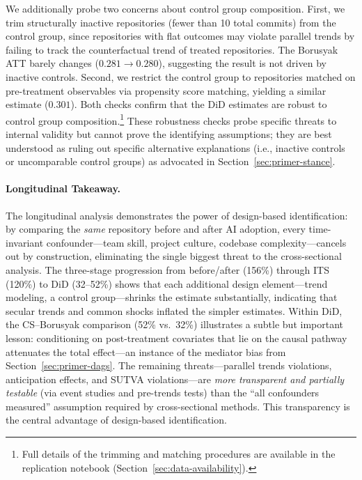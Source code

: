 We additionally probe two concerns about control group composition.
First, we trim structurally inactive repositories (fewer than 10 total commits) from the control group, since repositories with flat outcomes may violate parallel trends by failing to track the counterfactual trend of treated repositories.
The Borusyak ATT barely changes ($0.281 \to 0.280$), suggesting the result is not driven by inactive controls.
Second, we restrict the control group to repositories matched on pre-treatment observables via propensity score matching, yielding a similar estimate ($0.301$).
Both checks confirm that the DiD estimates are robust to control group composition.\footnote{Full details of the trimming and matching procedures are available in the replication notebook (Section~\ref{sec:data-availability}).}
These robustness checks probe specific threats to internal validity but cannot prove the identifying assumptions; they are best understood as ruling out specific alternative explanations (i.e., inactive controls or uncomparable control groups) as advocated in Section~\ref{sec:primer-stance}.

\paragraph{Longitudinal Takeaway.}
\label{sec:longitudinal-takeaway}

The longitudinal analysis demonstrates the power of design-based identification: by comparing the \emph{same} repository before and after AI adoption, every time-invariant confounder---team skill, project culture, codebase complexity---cancels out by construction, eliminating the single biggest threat to the cross-sectional analysis.
The three-stage progression from before/after (156\%) through ITS (120\%) to DiD (32--52\%) shows that each additional design element---trend modeling, a control group---shrinks the estimate substantially, indicating that secular trends and common shocks inflated the simpler estimates.
Within DiD, the CS--Borusyak comparison (52\% vs.\ 32\%) illustrates a subtle but important lesson: conditioning on post-treatment covariates that lie on the causal pathway attenuates the total effect---an instance of the mediator bias from Section~\ref{sec:primer-dags}.
The remaining threats---parallel trends violations, anticipation effects, and SUTVA violations---are \emph{more transparent and partially testable} (via event studies and pre-trends tests) than the ``all confounders measured'' assumption required by cross-sectional methods.
This transparency is the central advantage of design-based identification.

